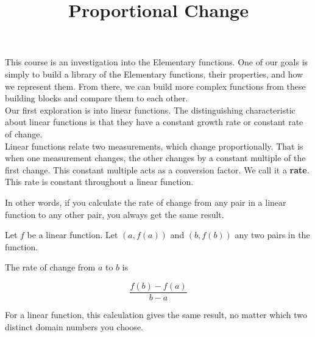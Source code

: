 \documentclass{ximera}
\title{Proportional Change}
\begin{document}
\begin{abstract}
\end{abstract}
\maketitle





This course is an investigation into the Elementary functions.  One of our goals is simply to build a library of the Elementary functions, their properties, and how we represent them.  From there, we can build more complex functions from these building blocks and compare them to each other. \\



Our first exploration is into linear functions. The distinguishing characteristic about linear functions is that they have a constant growth rate or constant rate of change.  \\




Linear functions relate two measurements, which change proportionally.  That is when one measurement changes, the other changes by a constant multiple of the first change.  This constant multiple acts as a conversion factor.  We call it a \textbf{\textcolor{purple!85!blue}{rate}}. \\



This rate is constant throughout a linear function.





In other words, if you calculate the rate of change from any pair in a linear function to any other pair, you always get the same result.

Let $f$ be a linear function.  Let $(a, f(a))$ and $(b, f(b))$ any two pairs in the function.

The rate of change from $a$ to $b$ is 

\[
\frac{f(b) - f(a)}{b-a}
\]


For a linear function, this calculation gives the same result, no matter which two distinct domain numbers you choose.
\end{document}
